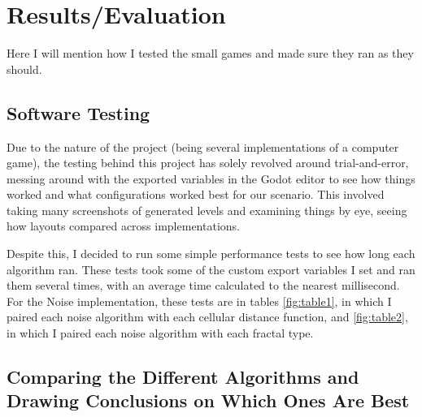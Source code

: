 \chapter{Results/Evaluation} \label{Evaluation}

Here I will mention how I tested the small games and made sure they ran as they should.

\section{Software Testing}

Due to the nature of the project (being several implementations of a computer game), the testing behind this project has solely revolved around trial-and-error, messing around with the exported variables in the Godot editor to see how things worked and what configurations worked best for our scenario. This involved taking many screenshots of generated levels and examining things by eye, seeing how layouts compared across implementations.

Despite this, I decided to run some simple performance tests to see how long each algorithm ran. These tests took some of the custom export variables I set and ran them several times, with an average time calculated to the nearest millisecond. For the Noise implementation, these tests are in tables \ref{fig:table1}, in which I paired each noise algorithm with each cellular distance function, and \ref{fig:table2}, in which I paired each noise algorithm with each fractal type.

\section{Comparing the Different Algorithms and Drawing Conclusions on Which Ones Are Best}
